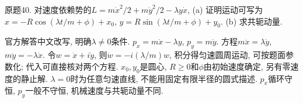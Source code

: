 \begin{exercise}
原题40. 对速度依赖势的$L=m\dot x^2/2+m\dot y^2/2-\lambda y\dot x$, (a) 证明运动可写为$x=-R\cos(\lambda t/m+\phi)+x_0$, $y=R\sin(\lambda t/m+\phi)+y_0$. (b) 求共轭动量.
\end{exercise}
\begin{solution}
官方解答中文改写, 明确$\lambda\ne0$条件. $p_x=m\dot x-\lambda y$, $p_y=m\dot y$. 方程$m\ddot x=\lambda\dot y$, $m\ddot y=-\lambda\dot x$. 令$w=\dot x+i\dot y$, 则$\dot w=-i(\lambda/m)w$, 积分得匀速圆周运动, 可按题面参数化; 代入可直接核对两个方程. $x_0,y_0$是圆心, $R\ge0$和$\phi$由初始速度确定, 另有零速度的静止解. $\lambda=0$时为任意匀速直线, 不能用固定有限半径的圆式描述. $p_x$循环守恒, $p_y$一般不守恒, 机械速度与共轭动量不同.
\end{solution}
